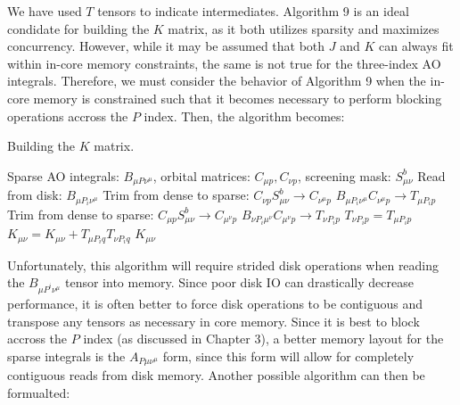 We have used $T$ tensors to indicate intermediates.
Algorithm 9 is an ideal condidate for building the $K$ matrix, as it both utilizes sparsity and maximizes concurrency.
However, while it may be assumed that both $J$ and $K$ can always fit within in-core memory constraints, the same is not true 
for the three-index AO integrals.  Therefore, we must consider the behavior of Algorithm 9 when the 
in-core memory is constrained such that it becomes necessary to perform blocking operations accross the $P$ index. Then, the algorithm
becomes: 

\begin{algorithm}[H]
\caption{Building the $K$ matrix.}
\begin{algorithmic}
\REQUIRE Sparse AO integrals: $B_{\mu P \nu^\mu}$, orbital matrices: $C_{\mu p}, C_{\nu p}$, screening mask: $S_{\mu \nu}^b$
    \STATE Read from disk: $B_{\mu P_i \nu^{\mu}}$
        \STATE Trim from dense to sparse: $C_{\nu p}S_{\mu \nu}^b \rightarrow C_{\nu^{\mu} p}$
        \STATE $B_{\mu P_i \nu^{\mu}} C_{\nu^{\mu} p} \rightarrow T_{\mu P_i p}$
            \STATE Trim from dense to sparse: $C_{\mu p}S_{\mu \nu}^b \rightarrow C_{\mu^{\nu} p}$
            \STATE $B_{\nu P_i \mu^{\nu}} C_{\mu^{\nu} p} \rightarrow T_{\nu P_i p}$
        \ELSE
            \STATE $T_{\nu P_i p} = T_{\mu P_i p}$ 
        \ENDIF
    \ENDFOR
    \STATE $K_{\mu \nu} = K_{\mu \nu} + T_{\mu P_i q} T_{\nu P_i q}$
\ENDFOR
\RETURN $K_{\mu \nu}$
\end{algorithmic}
\end{algorithm}

\noindent Unfortunately, this algorithm will require strided disk operations when reading the $B_{\mu P^i \nu^{\mu}}$ tensor into memory.
Since poor disk IO can drastically decrease performance, it is often better to force disk operations 
to be contiguous and transpose any tensors as necessary in core memory. Since it is best to block accross the $P$ index (as discussed in
Chapter 3), a better
memory layout for the sparse integrals is the $A_{P \mu \nu^\mu}$ form, since this form will allow for completely 
contiguous reads from disk memory. Another possible algorithm can then be formualted:

